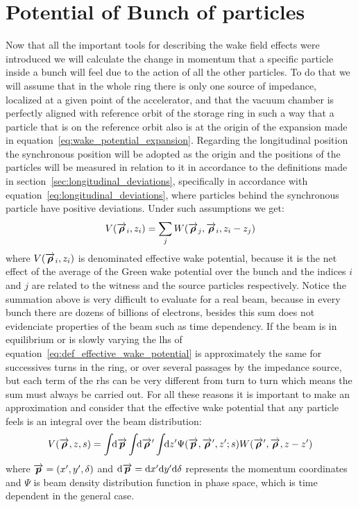 \section{Potential of Bunch of particles}\label{sec:potential_of_bunch}

    Now that all the important tools for describing the wake field effects were introduced we will calculate the change in momentum that a specific particle inside a bunch will feel due to the action of all the other particles. To do that we will assume that in the whole ring there is only one source of impedance, localized at a given point of the accelerator, and that the vacuum chamber is perfectly aligned with reference orbit of the storage ring in such a way that a particle that is on the reference orbit also is at the origin of the expansion made in equation~\eqref{eq:wake_potential_expansion}. Regarding the longitudinal position the synchronous position will be adopted as the origin and the positions of the particles will be measured in relation to it in accordance to the definitions made in section~\ref{sec:longitudinal_deviations}, specifically in accordance with equation~\ref{eq:longitudinal_deviations}, where particles behind the synchronous particle have positive deviations. Under such assumptions we get:
    \begin{align}\label{eq:def_effective_wake_potential}
  	    V(\overrightarrow{\boldsymbol{\rho}}_i, z_i) = \sum_j W(\overrightarrow{\boldsymbol{\rho}}_j,\overrightarrow{\boldsymbol{\rho}}_i,z_i-z_j)
    \end{align}
    where $V(\overrightarrow{\boldsymbol{\rho}}_i, z_i)$ is denominated effective wake potential, because it is the net effect of the average of the Green wake potential over the bunch and the indices $i$ and $j$ are related to the witness and the source particles respectively. Notice the summation above is very difficult to evaluate for a real beam, because in every bunch there are dozens of billions of electrons, besides this sum does not evidenciate properties of the beam such as time dependency. If the beam is in equilibrium or is slowly varying the \gls{lhs} of equation~\ref{eq:def_effective_wake_potential} is approximately the same for successives turns in the ring, or over several passages by the impedance source, but each term of the \gls{rhs} can be very different from turn to turn which means the sum must always be carried out. For all these reasons it is important to make an approximation and consider that the effective wake potential that any particle feels is an integral over the beam distribution:
    \begin{align}\label{eq:int_effective_wake_potential}
  	  	V(\overrightarrow{\boldsymbol{\rho}}, z, s) = \int\!\!\text{d}\overrightarrow{\boldsymbol{p}} \int\!\!\text{d}\overrightarrow{\boldsymbol{\rho}}' \int\!\!\text{d}z' 
	  			\Psi(\overrightarrow{\boldsymbol{p}},\overrightarrow{\boldsymbol{\rho}}',z'; s) W(\overrightarrow{\boldsymbol{\rho}}',\overrightarrow{\boldsymbol{\rho}},z-z')
    \end{align}
    where $\overrightarrow{\boldsymbol{p}} = (x', y', \delta)$ and $\text{d}\overrightarrow{\boldsymbol{p}} = \text{d}x'\text{d}y'\text{d}\delta$ represents the momentum coordinates and $\Psi$ is beam density distribution function in phase space, which is time dependent in the general case.

